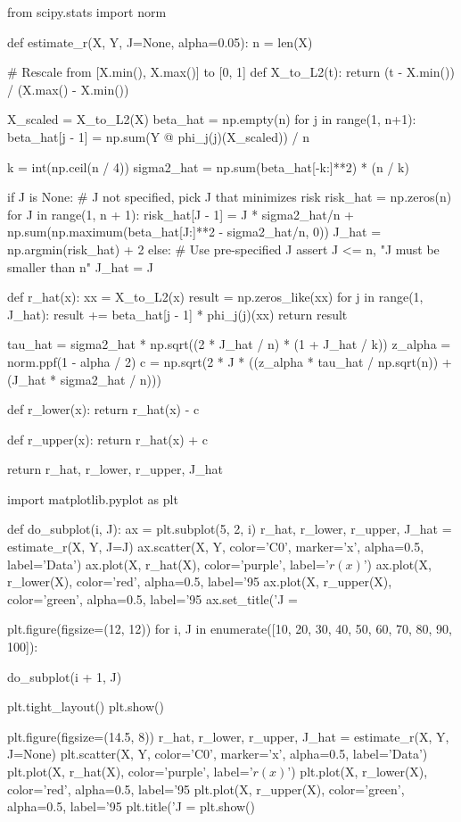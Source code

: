 \begin{python}
from scipy.stats import norm

def estimate_r(X, Y, J=None, alpha=0.05):
    n = len(X)

    # Rescale from [X.min(), X.max()] to [0, 1]
    def X_to_L2(t):
        return (t - X.min()) / (X.max() - X.min())
    
    X_scaled = X_to_L2(X)
    beta_hat = np.empty(n)
    for j in range(1, n+1):
        beta_hat[j - 1] = np.sum(Y @ phi_{j}(j)(X_scaled)) / n
        
    k = int(np.ceil(n / 4))
    sigma2_hat = np.sum(beta_hat[-k:]**2) * (n / k)

    if J is None:
        # J not specified, pick J that minimizes risk
        risk_hat = np.zeros(n)
        for J in range(1, n + 1):
            risk_hat[J - 1] = J * sigma2_hat/n + np.sum(np.maximum(beta_hat[J:]**2 - sigma2_hat/n, 0))
        J_hat = np.argmin(risk_hat) + 2
    else:
        # Use pre-specified J
        assert J <= n, "J must be smaller than n"
        J_hat = J

    def r_hat(x):
        xx = X_to_L2(x)
        result = np.zeros_like(xx)
        for j in range(1, J_hat):
            result += beta_hat[j - 1] * phi_{j}(j)(xx)
        return result
        
    tau_hat = sigma2_hat * np.sqrt((2 * J_hat / n) * (1 + J_hat / k))
    z_alpha = norm.ppf(1 - alpha / 2)
    c = np.sqrt(2 * J * ((z_alpha * tau_hat / np.sqrt(n)) + (J_hat * sigma2_hat / n)))
    
    def r_lower(x):
        return r_hat(x) - c
    
    def r_upper(x):
        return r_hat(x) + c
            
    return r_hat, r_lower, r_upper, J_hat
\end{python}

\begin{python}
import matplotlib.pyplot as plt

def do_subplot(i, J):
    ax = plt.subplot(5, 2, i)
    r_hat, r_lower, r_upper, J_hat = estimate_r(X, Y, J=J)
    ax.scatter(X, Y, color='C0', marker='x', alpha=0.5, label='Data')
    ax.plot(X, r_hat(X), color='purple', label='$r(x)$')
    ax.plot(X, r_lower(X), color='red', alpha=0.5, label='95%
    ax.plot(X, r_upper(X), color='green', alpha=0.5, label='95%
    ax.set_title('J = %
    
plt.figure(figsize=(12, 12))
for i, J in enumerate([10, 20, 30, 40, 50, 60, 70, 80, 90, 100]):
    
    do_subplot(i + 1, J)

plt.tight_layout()
plt.show()

plt.figure(figsize=(14.5, 8))
r_hat, r_lower, r_upper, J_hat = estimate_r(X, Y, J=None)
plt.scatter(X, Y, color='C0', marker='x', alpha=0.5, label='Data')
plt.plot(X, r_hat(X), color='purple', label='$r(x)$')
plt.plot(X, r_lower(X), color='red', alpha=0.5, label='95%
plt.plot(X, r_upper(X), color='green', alpha=0.5, label='95%
plt.title('J = %
plt.show()
\end{python}

